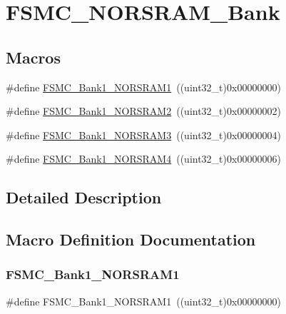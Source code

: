 \hypertarget{group___f_s_m_c___n_o_r_s_r_a_m___bank}{}\section{F\+S\+M\+C\+\_\+\+N\+O\+R\+S\+R\+A\+M\+\_\+\+Bank}
\label{group___f_s_m_c___n_o_r_s_r_a_m___bank}
\subsection*{Macros}
\begin{DoxyCompactItemize}
\item 
\#define \mbox{\hyperlink{group___f_s_m_c___n_o_r_s_r_a_m___bank_ga514a05828041fa1a13d464c9e4a0a4a9}{F\+S\+M\+C\+\_\+\+Bank1\+\_\+\+N\+O\+R\+S\+R\+A\+M1}}~((uint32\+\_\+t)0x00000000)
\item 
\#define \mbox{\hyperlink{group___f_s_m_c___n_o_r_s_r_a_m___bank_gaef52862c652370b9a658478d275dd956}{F\+S\+M\+C\+\_\+\+Bank1\+\_\+\+N\+O\+R\+S\+R\+A\+M2}}~((uint32\+\_\+t)0x00000002)
\item 
\#define \mbox{\hyperlink{group___f_s_m_c___n_o_r_s_r_a_m___bank_ga151b02506a318ac77382b52f3b5e16f4}{F\+S\+M\+C\+\_\+\+Bank1\+\_\+\+N\+O\+R\+S\+R\+A\+M3}}~((uint32\+\_\+t)0x00000004)
\item 
\#define \mbox{\hyperlink{group___f_s_m_c___n_o_r_s_r_a_m___bank_ga1083572834aa084d21e6698c280f8f74}{F\+S\+M\+C\+\_\+\+Bank1\+\_\+\+N\+O\+R\+S\+R\+A\+M4}}~((uint32\+\_\+t)0x00000006)
\end{DoxyCompactItemize}


\subsection{Detailed Description}


\subsection{Macro Definition Documentation}
\mbox{\label{group___f_s_m_c___n_o_r_s_r_a_m___bank_ga514a05828041fa1a13d464c9e4a0a4a9}} 
\subsubsection{\texorpdfstring{FSMC\_Bank1\_NORSRAM1}{FSMC\_Bank1\_NORSRAM1}}
{\footnotesize\ttfamily \#define F\+S\+M\+C\+\_\+\+Bank1\+\_\+\+N\+O\+R\+S\+R\+A\+M1~((uint32\+\_\+t)0x00000000)}

